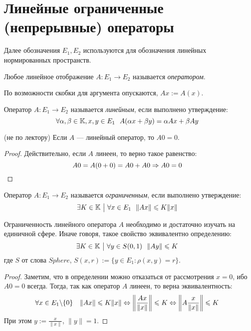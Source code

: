 \section{Линейные ограниченные (непрерывные) операторы}

\begin{note}
	Далее обозначения $E_1, E_2$ используются для обозначения линейных нормированных пространств.
\end{note}

\begin{definition}
	Любое линейное отображение $A \colon E_1 \to E_2$ называется \textit{оператором}.
\end{definition}

\begin{reminder}
	По возможности скобки для аргумента опускаются, $Ax := A(x)$.
\end{reminder}

\begin{definition}
	Оператор $A \colon E_1 \to E_2$ называется \textit{линейным}, если выполнено утверждение:
	\[
		\forall \alpha, \beta \in \K, x ,y \in E_1\ \ A(\alpha x + \beta y) = \alpha Ax + \beta Ay
	\]
\end{definition}

\begin{proposition} (не по лектору)
	Если $A$ --- линейный оператор, то $A0 = 0$.
\end{proposition}

\begin{proof}
	Действительно, если $A$ линеен, то верно такое равенство:
	\[
		A0 = A(0 + 0) = A0 + A0 \Rightarrow A0 = 0
	\]
\end{proof}

\begin{definition}
	Оператор $A \colon E_1 \to E_2$ называется \textit{ограниченным}, если выполнено утверждение:
	\[
		\exists K \in \K \such \forall x \in E_1\ \ \|Ax\| \le K\|x\|
	\]
\end{definition}

\begin{proposition}
	Ограниченность линейного оператора $A$ необходимо и достаточно изучать на единичной сфере. Иначе говоря, такое свойство эквивалентно определению:
	\[
		\exists K \in \mathbb{K} \ \big|\  \forall y \in S(0, 1)\ \ \|Ay\| \leqslant K
	\]
	где $S$ от слова $Sphere$, $S(x, r) := \{y \in E_1 \colon \rho(x, y) = r\}$.
\end{proposition}

\begin{proof}
	Заметим, что в определении можно отказаться от рассмотрения $x = 0$, ибо $A0 = 0$ всегда. Тогда, так как оператор $A$ линеен, то верна эквивалентность:
	\[
		\forall x \in E_1 \backslash \{0\}\quad \|Ax\| \leqslant K\|x\| \Leftrightarrow \left\|\frac{Ax}{\|x\|}\right\| \leqslant K \Leftrightarrow \left\|A\frac{x}{\|x\|}\right\| \leqslant K
	\]
	При этом $y := \frac{x}{\|x\|}$, $\|y\| = 1$.
\end{proof}
